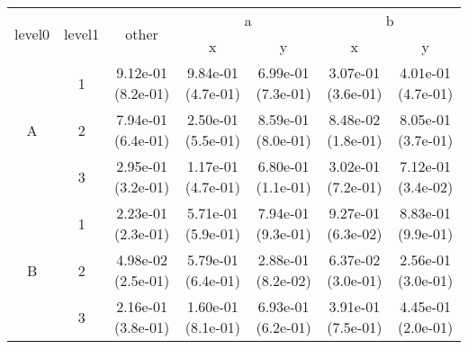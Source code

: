 \begin{tabular}{ccccccc}
\toprule
\multirow{2}{*}{level0} & \multirow{2}{*}{level1}& \multirow{2}{*}{other}&\multicolumn{2}{c}{a}&\multicolumn{2}{c}{b}\tabularnewline
\cmidrule(lr){4-5}
\cmidrule(lr){6-7}
&&&x&y&x&y\tabularnewline
\midrule
\multirow{3}{*}{A}&1& 9.12e-01 (8.2e-01)& 9.84e-01 (4.7e-01)& 6.99e-01 (7.3e-01)& 3.07e-01 (3.6e-01)& 4.01e-01 (4.7e-01)\tabularnewline
&2& 7.94e-01 (6.4e-01)& 2.50e-01 (5.5e-01)& 8.59e-01 (8.0e-01)& 8.48e-02 (1.8e-01)& 8.05e-01 (3.7e-01)\tabularnewline
&3& 2.95e-01 (3.2e-01)& 1.17e-01 (4.7e-01)& 6.80e-01 (1.1e-01)& 3.02e-01 (7.2e-01)& 7.12e-01 (3.4e-02)\tabularnewline
\midrule
\multirow{3}{*}{B}&1& 2.23e-01 (2.3e-01)& 5.71e-01 (5.9e-01)& 7.94e-01 (9.3e-01)& 9.27e-01 (6.3e-02)& 8.83e-01 (9.9e-01)\tabularnewline
&2& 4.98e-02 (2.5e-01)& 5.79e-01 (6.4e-01)& 2.88e-01 (8.2e-02)& 6.37e-02 (3.0e-01)& 2.56e-01 (3.0e-01)\tabularnewline
&3& 2.16e-01 (3.8e-01)& 1.60e-01 (8.1e-01)& 6.93e-01 (6.2e-01)& 3.91e-01 (7.5e-01)& 4.45e-01 (2.0e-01)\tabularnewline
\bottomrule
\end{tabular}
